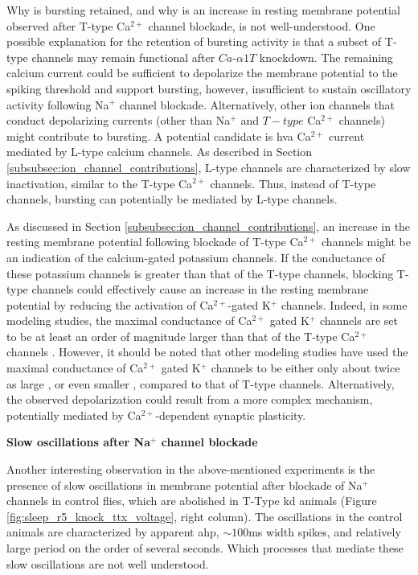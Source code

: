 \documentclass[../main.tex]{subfiles}
\begin{document}
Why is bursting retained, and why is an increase in resting membrane potential observed after T-type Ca$^{2+}$ channel blockade, is not well-understood. One possible explanation for the retention of bursting activity is that a subset of T-type channels may remain functional after $Ca$-$\alpha1T$ knockdown. The remaining calcium current could be sufficient to depolarize the membrane potential to the spiking threshold and support bursting, however, insufficient to sustain oscillatory activity following Na$^+$ channel blockade. Alternatively, other ion channels that conduct depolarizing currents (other than Na$^+$ and $T-type$ Ca$^{2+}$ channels) might contribute to bursting. A potential candidate is \gls{hva} Ca$^{2+}$ current mediated by L-type calcium channels. As described in Section \ref{subsubsec:ion_channel_contributions}, L-type channels are characterized by slow inactivation, similar to the T-type Ca$^{2+}$ channels. Thus, instead of T-type channels, bursting can potentially be mediated by L-type channels.

As discussed in Section \ref{subsubsec:ion_channel_contributions}, an increase in the resting membrane potential following blockade of T-type Ca$^{2+}$ channels might be an indication of the calcium-gated potassium channels. If the conductance of these potassium channels is greater than that of the T-type channels, blocking T-type channels could
effectively cause an increase in the resting membrane potential by reducing the activation of Ca$^{2+}$-gated K$^+$ channels. Indeed, in some modeling studies, the maximal conductance of
Ca$^{2+}$ gated K$^+$ channels are set to be at least an order of magnitude larger than that of the
T-type Ca$^{2+}$ channels \parencite{franciRobustTunableBursting2018,nowotnyProbingDynamicsIdentified2008}. However, it should be noted that other modeling studies have used the maximal conductance of Ca$^{2+}$ gated K$^+$ channels to be either only about twice as large \parencite{alonsoVisualizationCurrentsNeural2019}, or even smaller \parencite{parkMathematicalModelSubthalamic2021}, compared to that of T-type channels.
Alternatively, the observed depolarization could result from a more complex mechanism, potentially mediated by Ca$^{2+}$-dependent synaptic plasticity.

\vspace*{0.3cm}
\noindent\textbf{Slow oscillations after Na$^+$ channel blockade}

Another interesting observation in the above-mentioned experiments is the presence of slow oscillations in membrane potential after blockade of Na$^+$ channels in control flies, which are abolished in T-Type \gls{kd} animals (Figure \ref{fig:sleep_r5_knock_ttx_voltage}, right column). The oscillations in the control animals are characterized by apparent \gls{ahp}, $\sim100$ms width spikes, and relatively large period on the order of several seconds. Which processes that mediate these slow oscillations are not well understood.
\end{document}
